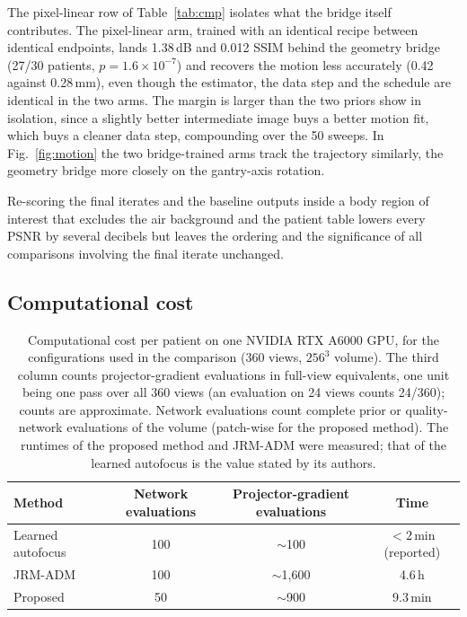 \documentclass[11pt]{article}
\begin{document}
The pixel-linear row of Table~\ref{tab:cmp} isolates what the bridge itself contributes. The
pixel-linear arm, trained with an identical recipe between identical endpoints, lands
1.38\,dB and 0.012 SSIM behind the geometry bridge (27/30 patients,
$p=1.6\times10^{-7}$) and recovers the motion less accurately (0.42 against 0.28\,mm),
even though the estimator, the data step and the schedule are identical in the two arms.
The margin is larger than the two priors show in isolation, since a slightly better
intermediate image buys a better motion fit, which buys a cleaner data step, compounding
over the 50 sweeps. In Fig.~\ref{fig:motion} the two bridge-trained arms track the
trajectory similarly, the geometry bridge more closely on the gantry-axis rotation.

Re-scoring the final iterates and the baseline outputs inside a body region of interest
that excludes the air background and the patient table lowers every PSNR by several
decibels but leaves the ordering and the significance of all comparisons involving the
final iterate unchanged.

\FloatBarrier
\subsection{Computational cost}
\label{sec:cost}

\begin{table}[H]
\centering
\caption{Computational cost per patient on one NVIDIA RTX A6000 GPU, for the
configurations used in the comparison (360 views, $256^3$ volume). The third column counts
projector-gradient evaluations in full-view equivalents, one unit being one pass over all
360 views (an evaluation on 24 views counts 24/360); counts are approximate. Network evaluations count complete prior or quality-network
evaluations of the volume (patch-wise for the proposed method). The runtimes of the proposed
method and JRM-ADM were measured; that of the learned autofocus is the value stated by its
authors.}
\label{tab:cost}
\small
\begin{tabular}{lccc}
\toprule
Method & Network evaluations & Projector-gradient evaluations & Time \\
\midrule
Learned autofocus~\cite{thies25} & 100 & $\sim$100 & $<2$\,min (reported) \\
JRM-ADM~\cite{depaepe25} & 100 & $\sim$1{,}600 & 4.6\,h \\
Proposed & 50 & $\sim$900 & 9.3\,min \\
\bottomrule
\end{tabular}
\end{table}
\end{document}
